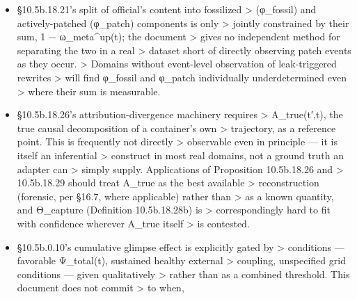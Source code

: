 \documentclass[
]{article}
\begin{document}
\begin{itemize}
  to this \textgreater{} revision and carry the same
  open-fitted-coefficient status as \textgreater{} everything above,
  plus one additional open question specific to \textgreater{}
  Ψ\_loyal(t): the trailing-slope proxy given for it is a proxy, not
  \textgreater{} a validated instrument, and nothing in this document
  yet \textgreater{} establishes how well a behavioral trend
  (ω\_meta\^{}up's own slope) \textgreater{} tracks the underlying
  orientation it is standing in for where \textgreater{} direct
  measurement is unavailable. Domains able to supply a direct
  \textgreater{} loyalty measurement should prefer it; the proxy exists
  so the \textgreater{} quantity is computable, not because it is known
  to be accurate.
\item
  §10.5b.18.21's split of official's content into fossilized
  \textgreater{} (φ\_fossil) and actively-patched (φ\_patch) components
  is only \textgreater{} jointly constrained by their sum, 1 −
  ω\_meta\^{}up(t); the document \textgreater{} gives no independent
  method for separating the two in a real \textgreater{} dataset short
  of directly observing patch events as they occur. \textgreater{}
  Domains without event-level observation of leak-triggered rewrites
  \textgreater{} will find φ\_fossil and φ\_patch individually
  underdetermined even \textgreater{} where their sum is measurable.
\item
  §10.5b.18.26's attribution-divergence machinery requires
  \textgreater{} A\_true(t′,t), the true causal decomposition of a
  container's own \textgreater{} trajectory, as a reference point. This
  is frequently not directly \textgreater{} observable even in principle
  --- it is itself an inferential \textgreater{} construct in most real
  domains, not a ground truth an adapter can \textgreater{} simply
  supply. Applications of Proposition 10.5b.18.26 and \textgreater{}
  10.5b.18.29 should treat A\_true as the best available \textgreater{}
  reconstruction (forensic, per §16.7, where applicable) rather than
  \textgreater{} as a known quantity, and Θ\_capture (Definition
  10.5b.18.28b) is \textgreater{} correspondingly hard to fit with
  confidence wherever A\_true itself \textgreater{} is contested.
\item
  §10.5b.0.10's cumulative glimpse effect is explicitly gated by
  \textgreater{} conditions --- favorable Ψ\_total(t), sustained healthy
  external \textgreater{} coupling, unspecified grid conditions ---
  given qualitatively \textgreater{} rather than as a combined
  threshold. This document does not commit \textgreater{} to when,

\end{itemize}
\end{document}
